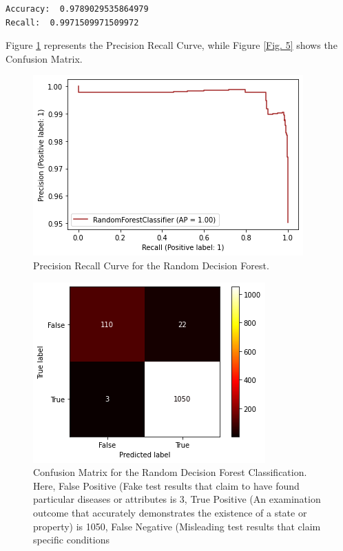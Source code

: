 \documentclass[sn-basic]{sn-jnl}%
\theoremstyle{thmstyleone}%
\theoremstyle{thmstyletwo}%
\theoremstyle{thmstylethree}%
\begin{document}
\begin{enumerate}
\begin{verbatim}
Accuracy:  0.9789029535864979
Recall:  0.9971509971509972
\end{verbatim}
Figure \ref{Fig. 4} represents the Precision Recall Curve, while Figure \ref{Fig. 5} shows the Confusion Matrix. 
\begin{figure}[!h]
\centering
\includegraphics[width=\textwidth]{PRC_RF}
\caption{Precision Recall Curve for the Random Decision Forest. }
\label{Fig. 4}
\end{figure}
\begin{figure}[!h]
\centering
\includegraphics[width=\textwidth]{CM_RF}
\caption{Confusion Matrix for the Random Decision Forest Classification. Here, False Positive (Fake test results that claim to have found particular diseases or attributes is 3, True Positive (An examination outcome that accurately demonstrates the existence of a state or property) is 1050, False Negative (Misleading test results that claim specific conditions
}
\end{figure}
\end{enumerate}
\end{document}

